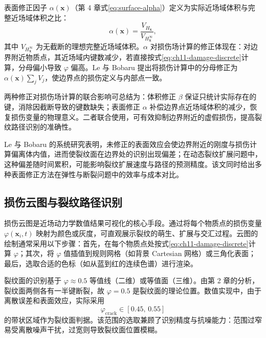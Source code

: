 表面修正因子 $\alpha(\mathbf{x})$（第 4 章式\eqref{eq:surface-alpha}）定义为实际近场域体积与完整近场域体积之比：
\begin{equation}
\alpha(\mathbf{x})=\frac{V_{H_{\mathbf{x}}}}{V_{H_{\mathbf{x}}^{\infty}}},
\label{eq:ch11-surface-alpha-recall}
\end{equation}
其中 $V_{H_{\mathbf{x}}^{\infty}}$ 为无截断的理想完整近场域体积。$\alpha$ 对损伤场计算的修正体现在：对边界附近物质点，其近场域内键数减少，若直接按式\eqref{eq:ch11-damage-discrete}计算，分母偏小导致 $\varphi$ 偏高。Le 与 Bobaru \cite{LeBobaru2018} 提出将损伤计算中的分母修正为 $\alpha(\mathbf{x})\sum_j V_j$，使边界点的损伤定义与内部点一致。

两种修正对损伤场计算的联合影响可总结为：体积修正 $\beta$ 保证只统计实际存在的键，消除因截断导致的键数缺失；表面修正 $\alpha$ 补偿边界点近场域体积的减少，恢复损伤变量的物理意义。二者联合使用，可有效抑制边界附近的虚假损伤，提高裂纹路径识别的准确性。

\begin{remark}
Le 与 Bobaru \cite{LeBobaru2018} 的系统研究表明，未修正的表面效应会使边界附近的刚度与损伤计算偏离体内值，进而使裂纹面在边界处的识别出现偏差；在动态裂纹扩展问题中，这种偏差随时间累积，可能影响裂纹扩展速度与路径的预测精度。该文同时给出多种表面修正方法在弹性与断裂问题中的效率与成本对比。
\end{remark}

\subsection{损伤云图与裂纹路径识别}\label{sec:ch11-damage-cloud}

损伤云图是近场动力学数值结果可视化的核心手段。通过将每个物质点的损伤变量 $\varphi(\mathbf{x}_i,t)$ 映射为颜色或灰度，可直观展示裂纹的萌生、扩展与交汇过程。云图的绘制通常采用以下步骤：首先，在每个物质点处按式\eqref{eq:ch11-damage-discrete}计算 $\varphi$；其次，将 $\varphi$ 值插值到规则网格（如背景 Cartesian 网格）或三角化表面；最后，选取合适的色标（如从蓝到红的连续色谱）进行渲染。

裂纹面的识别基于 $\varphi\approx 0.5$ 等值线（二维）或等值面（三维）。由第 2 章的分析，裂纹面两侧各有一半键断裂，故 $\varphi=0.5$ 是裂纹面的理论位置。数值实现中，由于离散误差和表面效应，实际采用
\begin{equation}
\varphi_{\mathrm{crack}}\in[0.45,\,0.55]
\label{eq:ch11-crack-range}
\end{equation}
的带状区域作为裂纹面判据。该范围的选取兼顾了识别精度与抗噪能力：范围过窄易受离散噪声干扰，过宽则导致裂纹面位置模糊。

